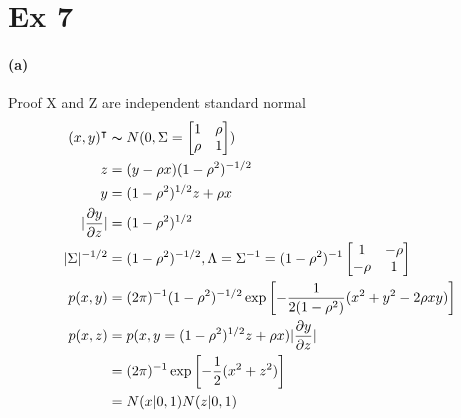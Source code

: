 \documentclass[11pt, letterpaper]{article}
\begin{document}
\newpage
\section{Ex 7}
\paragraph{(a)} Proof X and Z are independent standard normal
\begin{align*}
    (x, y)^{\intercal} &\thicksim N(0, \Sigma=\begin{bmatrix}1 & \rho \\ \rho & 1\end{bmatrix}) \\
    z &= (y - \rho x) (1-\rho^2)^{-1/2} \\
    y &= (1-\rho^2)^{1/2} z + \rho x \\
    |\frac{\partial y}{\partial z}| &= (1-\rho^2)^{1/2} \\
    |\Sigma|^{-1/2} &= (1-\rho^2)^{-1/2}, \Lambda = \Sigma^{-1} = (1-\rho^2)^{-1} \begin{bmatrix}1 & -\rho \\ -\rho & 1\end{bmatrix} \\
    p(x,y) &= (2\pi)^{-1}(1-\rho^2)^{-1/2} \exp\left[ -\frac{1}{2(1-\rho^2)}(x^2+y^2-2\rho x y) \right] \\
    p(x,z) &= p(x, y=(1-\rho^2)^{1/2} z + \rho x) |\frac{\partial y}{\partial z}| \\
        &= (2\pi)^{-1} \exp\left[-\frac{1}{2}(x^2 + z^2) \right] \\
        &= N(x|0, 1) N(z|0, 1)
\end{align*}
\end{document}
